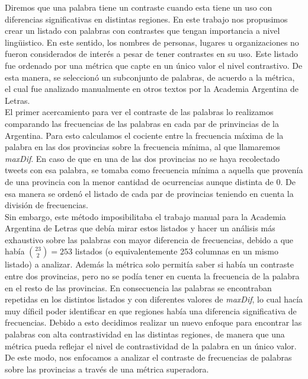 Diremos que una palabra tiene un contraste cuando esta tiene un uso con diferencias significativas en
distintas regiones. En este trabajo nos propusimos crear un listado con palabras con contrastes que tengan
importancia a nivel lingüistico. En este sentido, los nombres de personas, lugares u organizaciones no 
fueron considerados de interés a pesar de tener contrastes en su uso.
Este listado fue ordenado por una métrica que capte en un único valor el nivel contrastivo. De esta manera, 
se seleccionó un subconjunto de palabras, de acuerdo a la métrica, el cual fue analizado manualmente en otros textos por la Academia Argentina de Letras.\\
El primer acercamiento para ver el contraste de las palabras lo realizamos comparando las frecuencias de las palabras 
en cada par de prinvincias de la Argentina. Para esto calculamos el cociente entre la frecuencia máxima de la palabra
en las dos provincias sobre la frecuencia mínima, al que llamaremos \textit{maxDif}. En caso de que en una de las dos provincias no se haya 
recolectado tweets con esa palabra, se tomaba como frecuencia mínima a aquella que provenía de una provincia con la menor cantidad de ocurrencias aunque distinta de 0.
De esa manera se ordenó el listado de cada par de provincias teniendo en cuenta la división de frecuencias. \\
Sin embargo, este método imposibilitaba el trabajo manual para la Academia Argentina de Letras que debía mirar estos listados y hacer un análisis más exhaustivo sobre las palabras con mayor diferencia de frecuencias, debido a que había $\binom{23}{2} = 253$
listados (o equivalentemente 253 columnas en un mismo listado) a analizar. Además la métrica solo permitía saber si había un contraste entre dos provincias, pero no se podía tener en cuenta la frecuencia de la palabra en el resto de las provincias. 
En consecuencia las palabras se encontraban repetidas en los distintos listados y con diferentes valores de \textit{maxDif}, lo cual hacía muy díficil poder identificar en que regiones había una diferencia significativa de frecuencias. Debido a esto decidimos realizar un nuevo enfoque para encontrar las palabras con alta contrastividad en las distintas regiones, de manera que una métrica pueda reflejar el nivel de contrastividad de la palabra en un único valor.
De este modo, nos enfocamos a analizar el contraste de frecuencias de palabras sobre las provincias a través de una métrica superadora.

